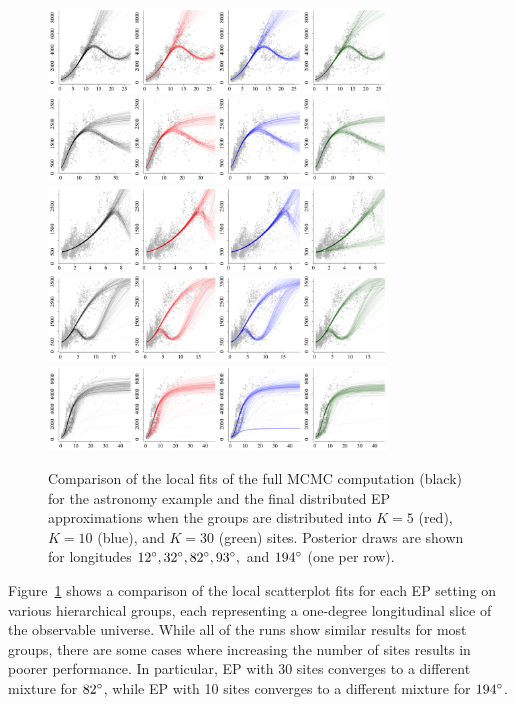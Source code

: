\begin{figure}
\centering
   \includegraphics[width=0.8\textwidth]{figures/astro_fit/1}
   \includegraphics[width=0.8\textwidth]{figures/astro_fit/2}
   \includegraphics[width=0.8\textwidth]{figures/astro_fit/3}
   \includegraphics[width=0.8\textwidth]{figures/astro_fit/5}
   \includegraphics[width=0.8\textwidth]{figures/astro_fit/6}
\caption{Comparison of the local fits of the full MCMC computation (black) for the astronomy example and the final distributed EP approximations when the groups are distributed into $K=5$ (red), $K=10$ (blue), and $K=30$ (green) sites. Posterior draws are shown for longitudes $12\degree, 32\degree, 82\degree, 93\degree,$ and $194\degree$ (one per row).}\label{fig:astro_compare}
\end{figure}

Figure~\ref{fig:astro_compare} shows a comparison of the local scatterplot fits for each EP setting on various hierarchical groups, each representing a one-degree longitudinal slice of the observable universe. While all of the runs show similar results for most groups, there are some cases where increasing the number of sites results in poorer performance. In particular, EP with 30 sites converges to a different mixture for $82\degree$, while EP with 10 sites converges to a different mixture for $194\degree$.